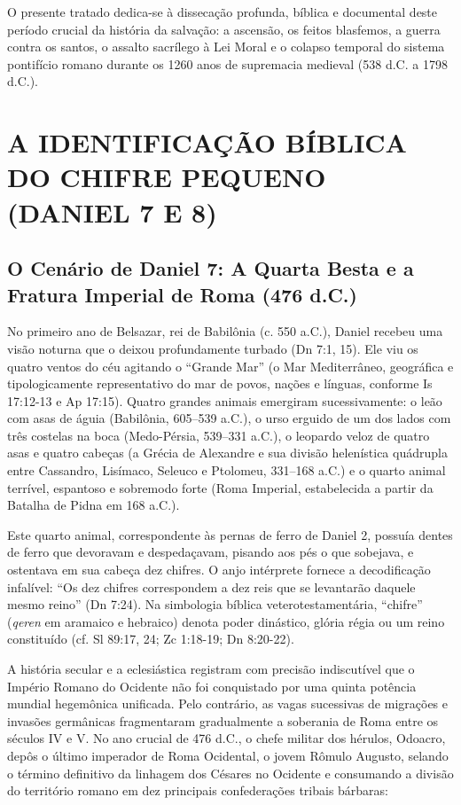 \documentclass[11pt,a4paper,openany]{book}
\begin{document}
O presente tratado dedica-se à dissecação profunda, bíblica e documental deste período crucial da história da salvação: a ascensão, os feitos blasfemos, a guerra contra os santos, o assalto sacrílego à Lei Moral e o colapso temporal do sistema pontifício romano durante os 1260 anos de supremacia medieval (538 d.C. a 1798 d.C.).



\section{A IDENTIFICAÇÃO BÍBLICA DO CHIFRE PEQUENO (DANIEL 7 E 8)}



\subsection{O Cenário de Daniel 7: A Quarta Besta e a Fratura Imperial de Roma (476 d.C.)}


No primeiro ano de Belsazar, rei de Babilônia (c. 550 a.C.), Daniel recebeu uma visão noturna que o deixou profundamente turbado (Dn 7:1, 15). Ele viu os quatro ventos do céu agitando o ``Grande Mar'' (o Mar Mediterrâneo, geográfica e tipologicamente representativo do mar de povos, nações e línguas, conforme Is 17:12-13 e Ap 17:15). Quatro grandes animais emergiram sucessivamente: o leão com asas de águia (Babilônia, 605–539 a.C.), o urso erguido de um dos lados com três costelas na boca (Medo-Pérsia, 539–331 a.C.), o leopardo veloz de quatro asas e quatro cabeças (a Grécia de Alexandre e sua divisão helenística quádrupla entre Cassandro, Lisímaco, Seleuco e Ptolomeu, 331–168 a.C.) e o quarto animal terrível, espantoso e sobremodo forte (Roma Imperial, estabelecida a partir da Batalha de Pidna em 168 a.C.).

Este quarto animal, correspondente às pernas de ferro de Daniel 2, possuía dentes de ferro que devoravam e despedaçavam, pisando aos pés o que sobejava, e ostentava em sua cabeça dez chifres. O anjo intérprete fornece a decodificação infalível: ``Os dez chifres correspondem a dez reis que se levantarão daquele mesmo reino'' (Dn 7:24). Na simbologia bíblica veterotestamentária, ``chifre'' (\textit{qeren} em aramaico e hebraico) denota poder dinástico, glória régia ou um reino constituído (cf. Sl 89:17, 24; Zc 1:18-19; Dn 8:20-22).

A história secular e a eclesiástica registram com precisão indiscutível que o Império Romano do Ocidente não foi conquistado por uma quinta potência mundial hegemônica unificada. Pelo contrário, as vagas sucessivas de migrações e invasões germânicas fragmentaram gradualmente a soberania de Roma entre os séculos IV e V. No ano crucial de 476 d.C., o chefe militar dos hérulos, Odoacro, depôs o último imperador de Roma Ocidental, o jovem Rômulo Augusto, selando o término definitivo da linhagem dos Césares no Ocidente e consumando a divisão do território romano em dez principais confederações tribais bárbaras:
\end{document}
